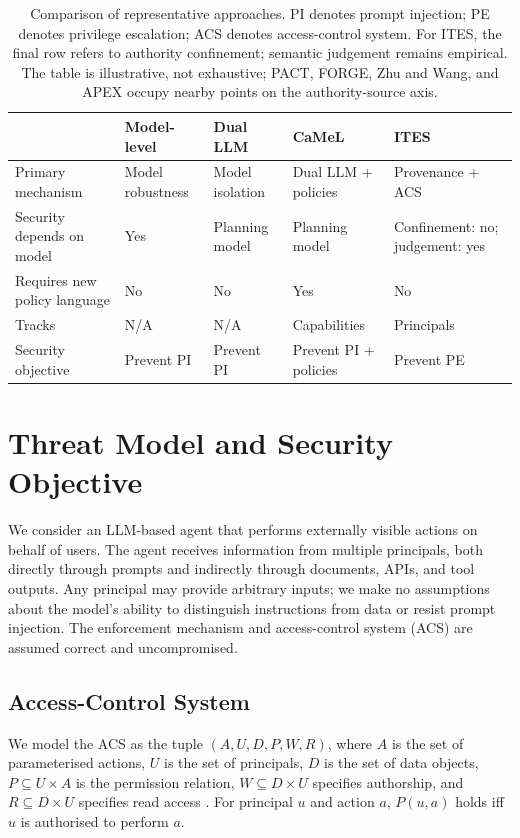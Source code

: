 \documentclass[11pt]{article}
\begin{document}
\begin{table}[h]
\centering
\small
\begin{tabular}{p{2.8cm}p{2.2cm}p{2.2cm}p{2.2cm}p{2.5cm}}
\toprule
& Model-level & Dual LLM & CaMeL & ITES \\
\midrule
Primary mechanism & Model robustness & Model isolation & Dual LLM + policies & Provenance + ACS \\
Security depends on model & Yes & Planning model & Planning model & Confinement: no; judgement: yes \\
Requires new policy language & No & No & Yes & No \\
Tracks & N/A & N/A & Capabilities & Principals \\
Security objective & Prevent PI & Prevent PI & Prevent PI + policies & Prevent PE \\
\bottomrule
\end{tabular}
\caption{Comparison of representative approaches. PI denotes prompt injection; PE denotes privilege escalation; ACS denotes access-control system. For ITES, the final row refers to authority confinement; semantic judgement remains empirical. The table is illustrative, not exhaustive; PACT, FORGE, Zhu and Wang, and APEX occupy nearby points on the authority-source axis.}
\label{tab:comparison}
\end{table}


\section{Threat Model and Security Objective}
\label{sec:threat}

We consider an LLM-based agent that performs externally visible actions on
behalf of users. The agent receives information from multiple principals,
both directly through prompts and indirectly through documents, APIs, and
tool outputs. Any principal may provide arbitrary inputs; we make no
assumptions about the model's ability to distinguish instructions from data
or resist prompt injection. The enforcement mechanism and access-control
system (ACS) are assumed correct and uncompromised.

\subsection{Access-Control System}

We model the ACS as the tuple $(A, U, D, P, W, R)$, where $A$ is the set of
parameterised actions, $U$ is the set of principals, $D$ is the set of data
objects, $P \subseteq U \times A$ is the permission relation, $W
\subseteq D \times U$ specifies authorship, and $R \subseteq D \times U$
specifies read access \citep{abac}. For principal $u$ and action $a$,
$P(u, a)$ holds iff $u$ is authorised to perform $a$.
\end{document}
